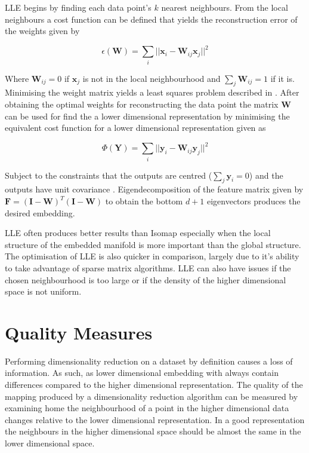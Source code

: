 LLE begins by finding each data point's $k$ nearest neighbours. From the local neighbours a cost function can be defined that yields the reconstruction error of the weights given by

\begin{equation}
	\epsilon(\bm{W}) = \sum\limits_i || \bm{x}_i - \bm{W}_{ij}\bm{x}_j ||^2 
\end{equation}

Where $\bm{W}_{ij} = 0$ if $\bm{x}_j$ is not in the local neighbourhood and $\sum\limits_j \bm{W}_{ij} = 1$ if it is. Minimising the weight matrix yields a least squares problem described in \cite{roweis2000nonlinear}. After obtaining the optimal weights for reconstructing the data point the matrix $\bm{W}$ can be used for find the a lower dimensional representation by minimising the equivalent cost function for a lower dimensional representation given as

 \begin{equation}
 	\Phi(\bm{Y}) = \sum\limits_i || \bm{y}_i - \bm{W}_{ij}\bm{y}_j ||^2 
 \end{equation}
 
 Subject to the constraints that the outputs are centred ($\sum\limits_j \bm{y}_i = 0$) and the outputs have unit covariance \cite{strange2014open}. Eigendecomposition of the feature matrix given by $\bm{F} = (\bm{I} - \bm{W})^T(\bm{I} - \bm{W})$  to obtain the bottom $d+1$ eigenvectors produces the desired embedding.
 
 LLE often produces better results than Isomap especially when the local structure of the embedded manifold is more important than the global structure. The optimisation of LLE is also quicker in comparison, largely due to it's ability to take advantage of sparse matrix algorithms. LLE can also have issues if the chosen neighbourhood is too large or if the density of the higher dimensional space is not uniform.

\section{Quality Measures}
\label{sec:quality-measures}
Performing dimensionality reduction on a dataset by definition causes a loss of information. As such, as lower dimensional embedding with always contain differences compared to the higher dimensional representation. The quality of the mapping produced by a dimensionality reduction algorithm can be measured by examining home the neighbourhood of a point in the higher dimensional data changes relative to the lower dimensional representation. In a good representation the neighbours in the higher dimensional space should be almost the same in the lower dimensional space. 

